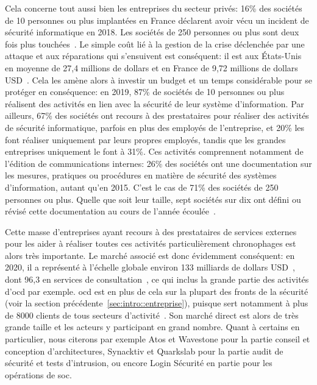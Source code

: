 \documentclass[12pt, oneside, a4paper, titlepage]{report}
\begin{document}
Cela concerne tout aussi bien les entreprises du secteur privés: 16\% des
sociétés de 10 personnes ou plus implantées en France déclarent avoir vécu un
incident de sécurité informatique en 2018. Les sociétés de 250 personnes ou plus
sont deux fois plus touchées~\cite{companies-security}. Le simple coût lié à la
gestion de la crise déclenchée par une attaque et aux réparations qui
s'ensuivent est conséquent: il est aux États-Unis en moyenne de 27,4 millions de
dollars et en France de 9,72 millions de dollars USD~\cite{attack-costs}. Cela
les amène alors à investir un budget et un temps considérable pour se protéger
en conséquence: en 2019, 87\% de sociétés de 10 personnes ou plus réalisent des
activités en lien avec la sécurité de leur système d'information. Par ailleurs,
67\% des sociétés ont recours à des prestataires pour réaliser des activités de
sécurité informatique, parfois en plus des employés de l'entreprise, et 20\% les
font réaliser uniquement par leurs propres employés, tandis que les grandes
entreprises uniquement le font à 31\%. Ces activités comprennent notamment de
l'édition de communications internes: 26\% des sociétés ont une documentation
sur les mesures, pratiques ou procédures en matière de sécurité des systèmes
d'information, autant qu'en 2015. C'est le cas de 71\% des sociétés de 250
personnes ou plus. Quelle que soit leur taille, sept sociétés sur dix ont défini
ou révisé cette documentation au cours de l'année
écoulée~\cite{companies-security}.

Cette masse d'entreprises ayant recours à des prestataires de services externes
pour les aider à réaliser toutes ces activités particulièrement chronophages est
alors très importante. Le marché associé est donc évidemment conséquent: en
2020, il a représenté à l'échelle globale environ 133 milliards de dollars
USD~\cite{security-market}, dont 96,3 en services de
consultation~\cite{security-consulting-market}, ce qui inclus la grande partie
des activités d'\gls{ocd} par exemple. \acrlong{ocd} est en plus de cela sur la
plupart des fronts de la sécurité (voir la section
précédente~\ref{sec:intro::entreprise}), puisque sert notamment à plus de 8000
clients de tous secteurs d'activité~\cite{ocd}. Son marché direct est alors de
très grande taille et les acteurs y participant en grand nombre. Quant à
certains en particulier, nous citerons par exemple Atos et Wavestone pour la
partie conseil et conception d'architectures, Synacktiv et Quarkslab pour la
partie audit de sécurité et tests d'intrusion, ou encore Login Sécurité en
partie pour les opérations de \gls{soc}.
\end{document}
